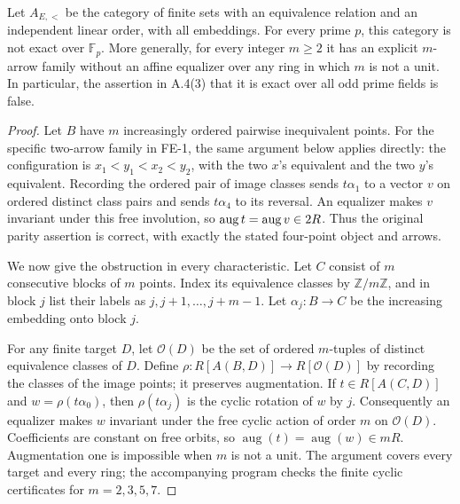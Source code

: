 \begin{proposition}
\label{A:equivalence-primes}
Let $A_{E,<}$ be the category of finite sets with an equivalence
relation and an independent linear order, with all embeddings. For
every prime $p$, this category is not exact over $\mathbb F_p$.
More generally, for every integer $m\geq2$ it has an explicit
$m$-arrow family without an affine equalizer over any ring in which
$m$ is not a unit. In particular, the assertion in A.4(3) that it is
exact over all odd prime fields is false.
\end{proposition}
\begin{proof}
Let $B$ have $m$ increasingly ordered pairwise inequivalent points.
For the specific two-arrow family in FE-1, the same argument below
applies directly: the configuration is
$x_1<y_1<x_2<y_2$, with the two $x$'s equivalent and the two
$y$'s equivalent. Recording the ordered pair of image classes
sends $t\alpha_1$ to a vector $v$ on ordered distinct class pairs
and sends $t\alpha_4$ to its reversal. An equalizer makes $v$
invariant under this free involution, so
$\operatorname{aug} t=\operatorname{aug} v\in2R$. Thus the original parity assertion is
correct, with exactly the stated four-point object and arrows.

We now give the obstruction in every characteristic.
Let $C$ consist of $m$ consecutive blocks of $m$ points. Index its
equivalence classes by $\mathbb Z/m\mathbb Z$, and in block $j$ list
their labels as $j,j+1,\ldots,j+m-1$. Let $\alpha_j:B\to C$ be
the increasing embedding onto block $j$.

For any finite target $D$, let $\mathscr O(D)$ be the set of ordered
$m$-tuples of distinct equivalence classes of $D$. Define
$\rho:R[A(B,D)]\to R[\mathscr O(D)]$ by recording the classes of the
image points; it preserves augmentation. If $t\in R[A(C,D)]$ and
$w=\rho(t\alpha_0)$, then $\rho(t\alpha_j)$ is the cyclic rotation
of $w$ by $j$. Consequently an equalizer makes $w$ invariant under
the free cyclic action of order $m$ on $\mathscr O(D)$. Coefficients
are constant on free orbits, so $\operatorname{aug}(t)=
\operatorname{aug}(w)\in mR$. Augmentation one is impossible when
$m$ is not a unit. The argument covers every target and every ring;
the accompanying program checks the finite cyclic certificates for
$m=2,3,5,7$.
\end{proof}

